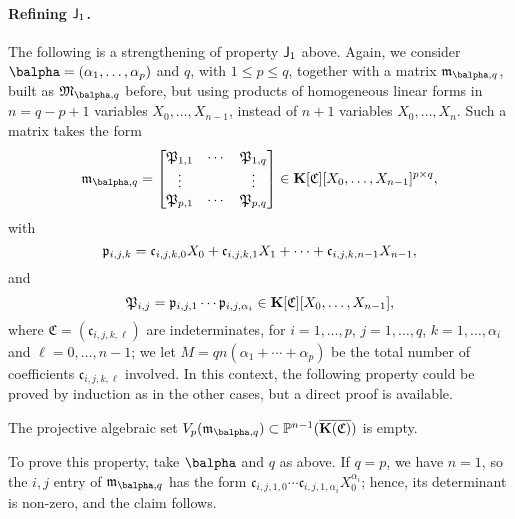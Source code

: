 \documentclass[12pt]{article}
\begin{document}
\paragraph{Refining $\mathsf{J}_1$.} The following  is a strengthening of 
property $\mathsf{J}_1$ above. Again, we consider $\balpha=(\alpha_1,\dots,\alpha_p)$
and $q$, with $1 \le p \le q$, together with a matrix
$\mathfrak{m}_{\balpha,q}$, built as $\mathfrak{M}_{\balpha,q}$ before, but
using products of homogeneous linear forms in $n=q-p+1$ variables $X_0,\dots,X_{n-1}$, instead of
$n+1$ variables $X_0,\dots,X_n$. Such a matrix takes the form
\begin{align}\label{eq:matM2}
\mathfrak{m}_{\balpha,q}=\left [\begin{matrix}
\mathfrak{P}_{1,1} & \cdots & \mathfrak{P}_{1,q}\\
 \vdots & & \vdots\\
\mathfrak{P}_{p,1} & \cdots & \mathfrak{P}_{p,q}
  \end{matrix}\right ]\in \KK[\mathfrak{C}][X_0,\dots,X_{n-1}]^{p\times q},
\end{align}
with 
$$\mathfrak{p}_{i,j,k} = \frak{c}_{i,j,k,0}X_0 + \frak{c}_{i,j,k,1} X_1 +\cdots + \frak{c}_{i,j,k,n-1} X_{n-1},$$
and
$$\mathfrak{P}_{i,j} = \mathfrak{p}_{i,j,1} \cdots
\mathfrak{p}_{i,j,\alpha_i} \in \mathbf{K}[\mathfrak{C}][X_0,\dots,X_{n-1}],$$
where $\mathfrak{C}=(\mathfrak{c}_{i,j,k,\ell})$ are indeterminates,
for $i=1,\dots,p$, $j=1,\dots,q$, $k=1,\dots,\alpha_i$ and
$\ell=0,\dots,n-1$; we let $M=q n (\alpha_1+\cdots +\alpha_p)$ be the total
number of coefficients $\mathfrak{c}_{i,j,k,\ell}$ involved. In this context, the
following property could be proved by induction as in the other cases,
but a direct proof is available.

\begin{description}[leftmargin=*]
\item[$\assI_3(\balpha,q).$] The projective algebraic set
  $V_p(\mathfrak{m}_{\balpha,q}) \subset \P^{n-1}(\KKCbar)$ is empty.
\end{description}
To prove this property, take $\balpha$ and $q$ as above. If $q=p$, we have
$n=1$, so the $i,j$ entry of $\mathfrak{m}_{\balpha,q}$ has the form
$\mathfrak{c}_{i,j,1,0}\cdots\mathfrak{c}_{i,j,1,\alpha_i} X_0^{\alpha_i}$; hence, its determinant is non-zero,
and the claim follows.
\end{document}
